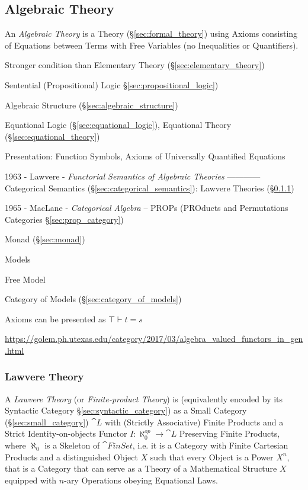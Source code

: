 \subsection{Algebraic Theory}\label{sec:algebraic_theory}

An \emph{Algebraic Theory} is a Theory (\S\ref{sec:formal_theory}) using Axioms
consisting of Equations between Terms with Free Variables (no Inequalities or
Quantifiers).

Stronger condition than Elementary Theory
(\S\ref{sec:elementary_theory})

Sentential (Propositional) Logic \S\ref{sec:propositional_logic})

Algebraic Structure (\S\ref{sec:algebraic_structure})

Equational Logic (\S\ref{sec:equational_logic}),
Equational Theory (\S\ref{sec:equational_theory})

Presentation: Function Symbols, Axioms of Universally Quantified
Equations

1963 - Lawvere - \emph{Functorial Semantics of Algebraic Theories} ------------
Categorical Semantics (\S\ref{sec:categorical_semantics}): Lawvere Theories
(\S\ref{sec:lawvere_theory})

1965 - MacLane - \emph{Categorical Algebra} -- PROPs (PROducts and Permutations
Categories \S\ref{sec:prop_category})

Monad (\S\ref{sec:monad})

Models

Free Model

Category of Models (\S\ref{sec:category_of_models})

Axioms can be presented as $\top \vdash t = s$


\url{https://golem.ph.utexas.edu/category/2017/03/algebra_valued_functors_in_gen.html}



\subsubsection{Lawvere Theory}\label{sec:lawvere_theory}

A \emph{Lawvere Theory} (or \emph{Finite-product Theory}) is (equivalently
encoded by its Syntactic Category \S\ref{sec:syntactic_category}) as a Small
Category (\S\ref{sec:small_category}) $\cat{L}$ with (Strictly Associative)
Finite Products and a Strict Identity-on-objects Functor $I : \aleph_0^{op}
\rightarrow \cat{L}$ Preserving Finite Products, where $\aleph_0$ is a Skeleton
of $\cat{FinSet}$, i.e. it is a Category with Finite Cartesian Products and a
distinguished Object $X$ such that every Object is a Power $X^n$, that is a
Category that can serve as a Theory of a Mathematical Structure $X$ equipped
with $n$-ary Operations obeying Equational Laws.

